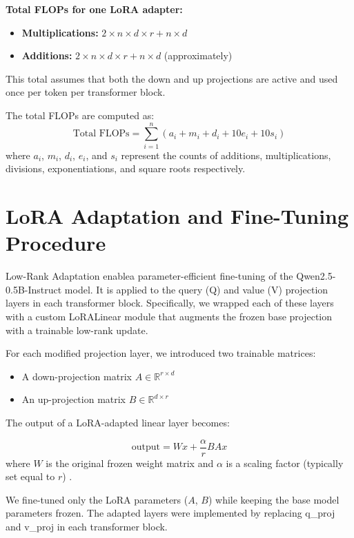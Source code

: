 \documentclass[a4paper,12pt]{article}
\begin{document}
\textbf{Total FLOPs for one LoRA adapter:}
\begin{itemize}
  \item \textbf{Multiplications:} $2 \times n \times d \times r + n \times d$
  \item \textbf{Additions:} $2 \times n \times d \times r + n \times d$ (approximately)
\end{itemize}
This total assumes that both the down and up projections are active and used once per token per transformer block.

The total FLOPs are computed as:
\begin{equation}
\text{Total FLOPs} = \sum_{i=1}^{n} \left( a_i + m_i + d_i + 10e_i + 10s_i \right)
\end{equation}
where $a_i$, $m_i$, $d_i$, $e_i$, and $s_i$ represent the counts of additions, multiplications, divisions, exponentiations, and square roots respectively.

\section{LoRA Adaptation and Fine-Tuning Procedure}

Low-Rank Adaptation enablea parameter-efficient fine-tuning of the Qwen2.5-0.5B-Instruct model. It is applied to the query (Q) and value (V) projection layers in each transformer block. Specifically, we wrapped each of these layers with a custom LoRALinear module that augments the frozen base projection with a trainable low-rank update.

For each modified projection layer, we introduced two trainable matrices:
\begin{itemize}
    \item A down-projection matrix $A \in \mathbb{R}^{r \times d}$
    \item An up-projection matrix $B \in \mathbb{R}^{d \times r}$
\end{itemize}

The output of a LoRA-adapted linear layer becomes:

\begin{equation}
\text{output} = W x + \frac{\alpha}{r} B A x
\end{equation}
where $W$ is the original frozen weight matrix and $\alpha$ is a scaling factor (typically set equal to $r$) \citep{hu2021lora}.

We fine-tuned only the LoRA parameters ($A$, $B$) while keeping the base model parameters frozen. The adapted layers were implemented by replacing q\_proj and v\_proj in each transformer block.
\end{document}

